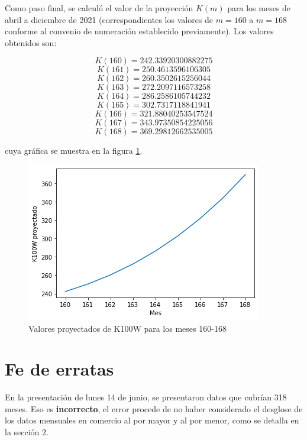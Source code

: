 \documentclass[twocolumn]{article}
\begin{document}
\medskip

Como paso final, se calculó el valor de la proyección $K(m)$ para los meses de abril a diciembre de 2021 (correspondientes los valores de $m=160$ a $m=168$ conforme al convenio de numeración establecido previamente). Los valores obtenidos son:

$$K(160) =  242.33920300882275$$
$$K(161) =  250.4613596106305$$
$$K(162) =  260.3502615256044$$
$$K(163) =  272.2097116573258$$
$$K(164) =  286.2586105744232$$
$$K(165) =  302.7317118841941$$
$$K(166) =  321.88040253547524$$
$$K(167) =  343.97350854225056$$
$$K(168) =  369.29812662535005$$

cuya gráfica se muestra en la figura \ref{fig:4}.

\begin{figure}[h]
\includegraphics[width=\columnwidth]{fig_4}
\caption{Valores proyectados de K100W para los meses 160-168}
\label{fig:4}
\end{figure}

\section{Fe de erratas}

En la presentación de lunes 14 de junio, se presentaron datos que cubrían 318 meses. Eso es \textbf{incorrecto}, el error procede de no haber considerado el desglose de los datos mensuales en comercio al por mayor y al por menor, como se detalla en la sección 2.
\end{document}
